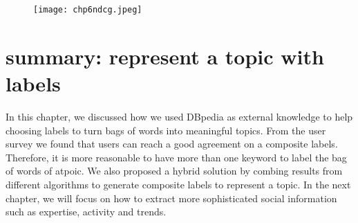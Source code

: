 \begin{figure}[htp]
\centering
\texttt{[image: chp6ndcg.jpeg]}  
\caption{}
\label{fig:chp6ndcg} 
\end{figure}




\section{summary: represent a topic with labels}
In this chapter, we discussed how we used DBpedia as external knowledge to help choosing labels to turn bags of words into meaningful topics. From the user survey we found that users can reach a good agreement on a composite labels. Therefore, it is more reasonable to have more than one keyword to label the bag of words of atpoic. We also proposed a hybrid solution by combing results from different algorithms to generate composite labels to represent a topic. In the next chapter, we will focus on how to extract more sophisticated social information such as expertise, activity and trends.
